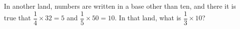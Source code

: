 In another land, numbers are written in a base other than ten, and there it is true that $\dfrac{1}{4}\times32=5$ and $\dfrac{1}{5}\times50=10$. In that land, what is $\dfrac{1}{3}\times10$?
